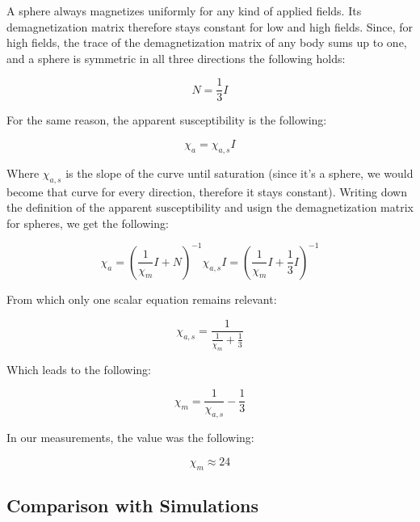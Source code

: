 A sphere always magnetizes uniformly for any kind of applied fields. Its demagnetization matrix therefore stays constant for low and high fields. Since, for high fields, the trace of the demagnetization matrix of any body sums up to   one, and a sphere is symmetric in all three directions the following holds:

\begin{equation}
N = \frac{1}{3}I
\end{equation}

For the same reason, the apparent susceptibility is the following:

\begin{equation}
\chi_a = \chi_{a,s}I
\end{equation}

Where $\chi_{a,s}$ is the slope of the curve until saturation (since it's a sphere, we would become that curve for every direction, therefore it stays constant). Writing down the definition of the apparent susceptibility and usign the demagnetization matrix for spheres, we get the following:

\begin{subequations}
\begin{equation}
\chi_a = \left(\frac{1}{\chi_m}I+N\right)^{-1}
\end{equation}
\begin{equation}
 \chi_{a,s}I = \left(\frac{1}{\chi_m}I+\frac{1}{3}I\right)^{-1}
\end{equation}
\end{subequations}

From which only one scalar equation remains relevant:

\begin{equation}
 \chi_{a,s} = \frac{1}{\frac{1}{\chi_m}+\frac{1}{3}}
\end{equation}

Which leads to the following:

\begin{equation}
 \chi_{m} = \frac{1}{\chi_{a,s}}-\frac{1}{3}
\end{equation}

In our measurements, the value was the following:

\begin{equation}
\chi_m \approx 24
\end{equation}


\subsection{Comparison with Simulations}


